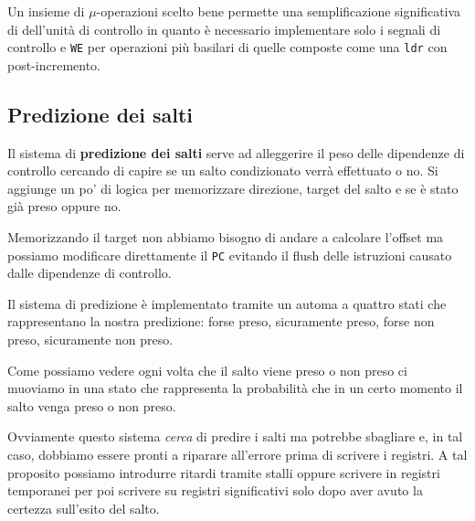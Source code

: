 Un insieme di $\mu$-operazioni scelto bene permette una semplificazione significativa di dell'unità
di controllo in quanto è necessario implementare solo i segnali di controllo e \verb|WE| per
operazioni più basilari di quelle composte come una \verb|ldr| con post-incremento.

\subsection{Predizione dei salti}
Il sistema di \textbf{predizione dei salti} serve ad alleggerire il peso delle dipendenze di
controllo cercando di capire se un salto condizionato verrà effettuato o no. Si aggiunge un po' di
logica per memorizzare direzione, target del salto e se è stato già preso oppure no.

Memorizzando il target non abbiamo bisogno di andare a calcolare l'offset ma possiamo modificare
direttamente il \verb|PC| evitando il flush delle istruzioni causato dalle dipendenze di controllo.

Il sistema di predizione è implementato tramite un automa a quattro stati che rappresentano la
nostra predizione: forse preso, sicuramente preso, forse non preso, sicuramente non preso.
\begin{center}
\end{center}
Come possiamo vedere ogni volta che il salto viene preso o non preso ci muoviamo in una stato che
rappresenta la probabilità che in un certo momento il salto venga preso o non preso.

Ovviamente questo sistema \emph{cerca} di predire i salti ma potrebbe sbagliare e, in tal caso,
dobbiamo essere pronti a riparare all'errore prima di scrivere i registri. A tal proposito possiamo
introdurre ritardi tramite stalli oppure scrivere in registri temporanei per poi scrivere su
registri significativi solo dopo aver avuto la certezza sull'esito del salto.

